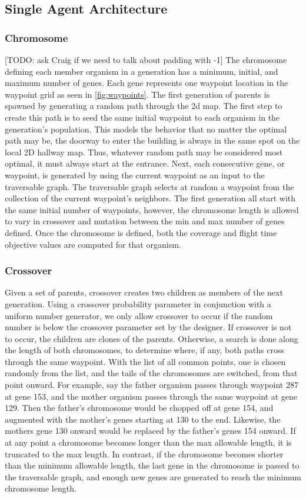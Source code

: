 \documentclass[letterpaper, 10 pt, conference]{ieeeconf}  %
\newcommand{\todo}[1]{{\color{blue}[TODO: #1]}}
\begin{document}
\subsection{Single Agent Architecture}

\subsubsection{Chromosome}
\todo{ask Craig if we need to talk about padding with -1}
The chromosome defining each member organism in a generation has a minimum, initial, and maximum number of genes. Each gene represents one waypoint location in the waypoint grid as seen in \ref{fig:waypoints}. The first generation of parents is spawned by generating a random path through the 2d map. The first step to create this path is to seed the same initial waypoint to each organism in the generation's population. This models the behavior that no matter the optimal path may be, the doorway to enter the building is always in the same spot on the local 2D hallway map. Thus, whatever random path may be considered most optimal, it must always start at the entrance. Next, each consecutive gene, or waypoint, is generated by using the current waypoint as an input to the traversable graph. The traversable graph selects at random a waypoint from the collection of the current waypoint's neighbors. The first generation all start with the same initial number of waypoints, however, the chromosome length is allowed to vary in crossover and mutation between the min and max number of genes defined. Once the chromosome is defined, both the coverage and flight time objective values are computed for that organism.

\subsubsection{Crossover}

Given a set of parents, crossover creates two children as members of the next generation. Using a crossover probability parameter in conjunction with a uniform number generator, we only allow crossover to occur if the random number is below the crossover parameter set by the designer. If crossover is not to occur, the children are clones of the parents. Otherwise, a search is done along the length of both chromosomes, to determine where, if any, both paths cross through the same waypoint. With the list of all common points, one is chosen randomly from the list, and the tails of the chromosomes are switched, from that point onward. For example, say the father organism passes through waypoint 287 at gene 153, and the mother organism passes through the same waypoint at gene 129. Then the father's chromosome would be chopped off at gene 154, and augmented with the mother's genes starting at 130 to the end. Likewise, the mothers gene 130 onward would be replaced by the father's genes 154 onward. If at any point a chromosome becomes longer than the max allowable length, it is truncated to the max length. In contrast, if the chromosome becomes shorter than the minimum allowable length, the last gene in the chromosome is passed to the traversable graph, and enough new genes are generated to reach the minimum chromosome length.
\end{document}
